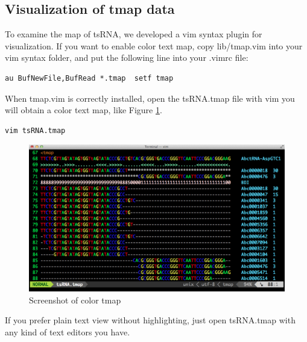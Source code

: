 \documentclass[11pt, a4paper]{article}
\begin{document}
\subsection{Visualization of tmap data}

To examine the map of tsRNA, we developed a vim syntax plugin for visualization. If you want to enable color text map, copy lib/tmap.vim into your vim syntax folder, and put the following line into your .vimrc file:

{\footnotesize \begin{tcolorbox}[colback=blue!5!white,colframe=blue!75!black,title=Set filetype tmap in vim]
\begin{verbatim}
au BufNewFile,BufRead *.tmap  setf tmap
\end{verbatim}
\end{tcolorbox}}

When tmap.vim is correctly installed, open the tsRNA.tmap file with vim you will obtain a color text map, like Figure \ref{tmap}.

{\footnotesize \begin{tcolorbox}[colback=blue!5!white,colframe=blue!75!black,title=Visualization tsRNA.tmap]
\begin{verbatim}
vim tsRNA.tmap
\end{verbatim}
\end{tcolorbox}}

\begin{figure}[htbp]
\begin{center}
\includegraphics[width=12cm]{tmap.png}
\caption{Screenshot of color tmap} 
\label{tmap}
\end{center}
\end{figure}

If you prefer plain text view without highlighting, just open tsRNA.tmap with any kind of text editors you have.
\end{document}
